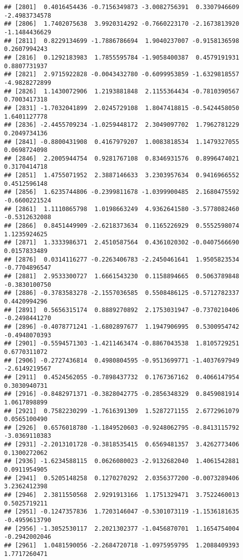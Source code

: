 \documentclass[
]{article}
\begin{document}
\begin{verbatim}
## [2801]  0.4016454436 -0.7156349873 -3.0082756391  0.3307946609 -2.4983734578
## [2806]  1.7402075638  3.9920314292 -0.7660223170 -2.1673813920 -1.1484436629
## [2811]  0.8229134699 -1.7886786694  1.9040237007 -0.9158136598  0.2607994243
## [2816]  0.1292183983  1.7855595784 -1.9058400387  0.4579191931  0.8807731937
## [2821]  2.9715922828 -0.0043432780 -0.6099953859 -1.6329818557 -4.9828272899
## [2826]  1.1430072906  1.2193881848  2.1155364434 -0.7810390567  0.7003417318
## [2831] -1.7032041899  2.0245729108  1.8047418815 -0.5424458050  1.6401127778
## [2836] -2.4455709234 -1.0259448172  2.3049097702  1.7962781229  0.2049734136
## [2841] -0.8800431908  0.4167979207  1.0083818534  1.1479327055  0.0698724098
## [2846]  2.2005944754  0.9281767108  0.8346931576  0.8996474021  0.3170414718
## [2851]  1.4755071952  2.3887146633  3.2303957634  0.9416966552  0.4512596148
## [2856]  1.6235744806 -0.2399811678 -1.0399900485  2.1680475592 -0.6600221524
## [2861]  1.1110865798  1.0198663249  4.9362641580 -3.5778082460 -0.5312632088
## [2866]  0.8451449909 -2.6218373634  0.1165226929  0.5552598074  1.1235924625
## [2871]  1.3333986371  2.4510587564  0.4361020302 -0.0407566690  0.0157833489
## [2876]  0.0314116277 -0.2263406783 -2.2450461641  1.9505823534 -0.7704896547
## [2881]  2.9533300727  1.6661543230  0.1158894665  0.5063789848 -0.3830100750
## [2886] -0.3783583278 -2.1557036585  0.5508486125 -0.5712782337  0.4420994296
## [2891]  0.5656315174  0.8889270892  2.1753031947 -0.7370210406 -0.2498441270
## [2896] -0.4078771241 -1.6802897677  1.1947906995  0.5300954742 -0.4948070393
## [2901] -0.5594571303 -1.4211463474 -0.8867043538  1.8105729251  0.6770311072
## [2906] -0.2727436814  0.4980804595 -0.9513699771 -1.4037697949 -2.6149219567
## [2911]  0.4524562055 -0.7898437732  0.1767367162  0.4066147954  0.3030940731
## [2916] -0.8482971371 -0.3828042775 -0.2856348329  0.8459081914  1.0617898899
## [2921]  0.7582230299 -1.7616391309  1.5287271155  2.6772961079  0.0565100490
## [2926]  0.6576018780 -1.1849520603 -0.9248062795 -0.8413115792 -3.0369110383
## [2931] -2.2013101728 -0.3818535415  0.6569481357  3.4262773406  0.1300272062
## [2936] -1.6234588115  0.0626080023 -2.9132682040  1.4061542881  0.0911954905
## [2941]  0.5205148258  0.1270270292  2.0356377200 -0.0073289406  3.2362412398
## [2946]  2.3811550568  2.9291913166  1.1751329471  3.7522460013  0.5025719211
## [2951] -0.1247357836  1.7203146047 -0.5301073119 -1.1536181635 -0.4959613790
## [2956] -1.3052530117  2.2021302377 -1.0456870701  1.1654754004 -0.2942002046
## [2961]  1.0481590056 -2.2684720718 -1.0975959795  1.2088409393  1.7717260471

\end{verbatim}
\end{document}
